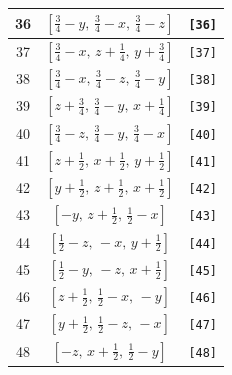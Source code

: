 \documentclass[fleqn,8pt]{jsarticle}
\begin{document}
\begin{longtable}{ccc}
36 & $\left[ \frac{3}{4} - y,\, \frac{3}{4} - x,\, \frac{3}{4} - z \right]$ & {\tt [36]} \\ \hline
37 & $\left[ \frac{3}{4} - x,\, z + \frac{1}{4},\, y + \frac{3}{4} \right]$ & {\tt [37]} \\ \hline
38 & $\left[ \frac{3}{4} - x,\, \frac{3}{4} - z,\, \frac{3}{4} - y \right]$ & {\tt [38]} \\ \hline
39 & $\left[ z + \frac{3}{4},\, \frac{3}{4} - y,\, x + \frac{1}{4} \right]$ & {\tt [39]} \\ \hline
40 & $\left[ \frac{3}{4} - z,\, \frac{3}{4} - y,\, \frac{3}{4} - x \right]$ & {\tt [40]} \\ \hline
41 & $\left[ z + \frac{1}{2},\, x + \frac{1}{2},\, y + \frac{1}{2} \right]$ & {\tt [41]} \\ \hline
42 & $\left[ y + \frac{1}{2},\, z + \frac{1}{2},\, x + \frac{1}{2} \right]$ & {\tt [42]} \\ \hline
43 & $\left[ - y,\, z + \frac{1}{2},\, \frac{1}{2} - x \right]$ & {\tt [43]} \\ \hline
44 & $\left[ \frac{1}{2} - z,\, - x,\, y + \frac{1}{2} \right]$ & {\tt [44]} \\ \hline
45 & $\left[ \frac{1}{2} - y,\, - z,\, x + \frac{1}{2} \right]$ & {\tt [45]} \\ \hline
46 & $\left[ z + \frac{1}{2},\, \frac{1}{2} - x,\, - y \right]$ & {\tt [46]} \\ \hline
47 & $\left[ y + \frac{1}{2},\, \frac{1}{2} - z,\, - x \right]$ & {\tt [47]} \\ \hline
48 & $\left[ - z,\, x + \frac{1}{2},\, \frac{1}{2} - y \right]$ & {\tt [48]} \\
\end{longtable}
\end{document}
